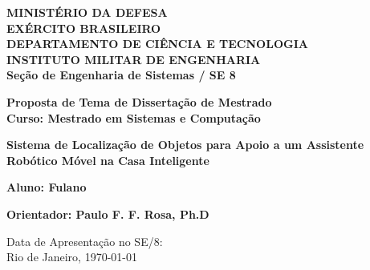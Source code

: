 \begin{center}
\textbf{MINISTÉRIO DA DEFESA}\\
\textbf{EXÉRCITO BRASILEIRO}\\
\textbf{DEPARTAMENTO DE CIÊNCIA E TECNOLOGIA}\\
\textbf{INSTITUTO MILITAR DE ENGENHARIA}\\
\textbf{Seção de Engenharia de Sistemas / SE 8}

\vspace{2.5cm}

\begin{large}
\textbf{Proposta de Tema de Dissertação de Mestrado
\\Curso: Mestrado em Sistemas e Computação}

\vspace{1.5cm}

\textbf{Sistema de Localização de Objetos para Apoio a um Assistente Robótico Móvel na Casa Inteligente}

\vspace{1.5cm}

\textbf{Aluno: Fulano}

\vspace{1.5cm}

\textbf{Orientador: Paulo F. F. Rosa, Ph.D}

\end{large}

\vspace{2cm}

\begin{small}
Data de Apresentação no SE/8:\\
Rio de Janeiro, \today
\end{small}

\end{center}

\pagebreak
